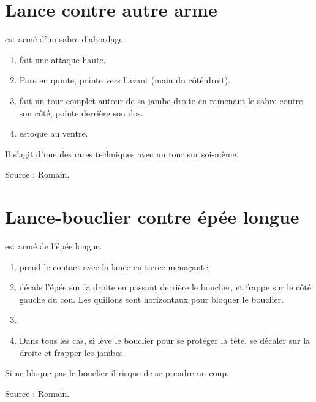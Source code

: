 \section{Lance contre autre arme}


\begin{technique}
\D est armé d'un sabre d'abordage.

\begin{enumerate}
	\item \A fait une attaque haute.
	
	\item \D Pare en quinte, pointe vers l'avant (main du côté droit).
	
	\item \D fait un tour complet autour de sa jambe droite en ramenant le sabre contre son côté, pointe derrière son dos.
	
	\item \D estoque \A au ventre.
\end{enumerate}

Il s'agit d'une des rares techniques avec un tour sur soi-même.

Source : Romain.
\end{technique}


\section{Lance-bouclier contre épée longue}


\begin{technique}

\A est armé de l'épée longue.

\begin{enumerate}
	\item \A prend le contact avec la lance en tierce menaçante.
	
	\item \A décale l'épée sur la droite en passant derrière le bouclier, et frappe sur le côté gauche du cou.
	Les quillons sont horizontaux pour bloquer le bouclier.
	
	\item {}
	
	\item Dans tous les cas, si \D lève le bouclier pour se protéger la tête, se décaler sur la droite et frapper les jambes.
\end{enumerate}

Si \A ne bloque pas le bouclier il risque de se prendre un coup.

Source : Romain.
\end{technique}




